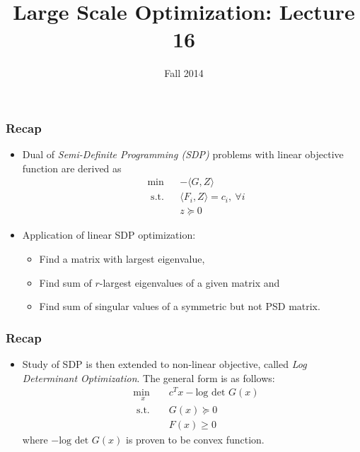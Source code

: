 \documentclass{beamer}
\date{}
\title{Large Scale Optimization: Lecture 16}
\author{Fall 2014}
\institute[]{The University of Texas at Austin}
\begin{document}
\begin{frame}
  \titlepage
\end{frame}

\begin{frame}
  \frametitle{Recap}
  \begin{itemize}
      \item Dual of {\it Semi-Definite Programming (SDP)} problems with linear
objective function are derived as 
\begin{equation}
\begin{aligned}
    &\underset{}{\text{min}} && - \langle G, Z \rangle  \\
    &\text{ s.t.} && \langle F_i, Z \rangle = c_i,\ \forall i  \\
       & && z \succeq 0
\end{aligned}
\end{equation}
\item Application of linear SDP optimization:
\begin{itemize}
    \item Find a matrix with largest eigenvalue, 
    \item Find sum of $r$-largest eigenvalues of a given matrix and
    \item Find sum of singular values of a symmetric but not PSD matrix.
\end{itemize}
\end{itemize}
\end{frame}

\begin{frame}
\frametitle{Recap}
\begin{itemize}
    \item Study of SDP is then extended to non-linear objective, called
{\it Log Determinant Optimization}. The general form is as follows:
\begin{equation}
\begin{aligned}
    &\underset{x}{\text{min }} && c^T x - \text{log det } G(x) \\
    &\text{ s.t.} && G(x) \succeq 0 \\
    & && F(x) \geq 0
\end{aligned}
\end{equation}
where $- \text{log det } G(x)$ is proven to be convex function. 
\end{itemize}
\end{frame}
\end{document}
